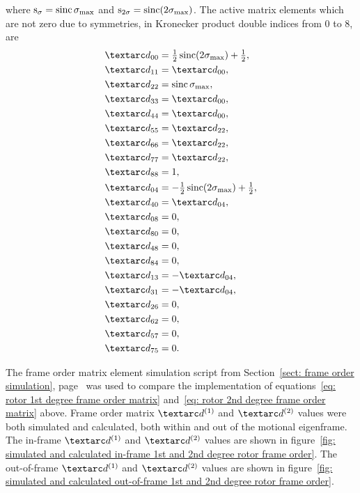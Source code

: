 where $\textrm{s}_\sigma = \operatorname{sinc}\sigma_\textrm{max}$ and $\textrm{s}_{2\sigma} = \operatorname{sinc}(2\sigma_\textrm{max})$.
The active matrix elements which are not zero due to symmetries, in Kronecker product double indices from 0 to 8, are
\begin{subequations} \label{eq: rotor 2nd degree frame order matrix}
\begin{align}
    &\FO_{00} = \half\sinc(2\conesmax) + \half , \\
    &\FO_{11} = \FO_{00} , \\
    &\FO_{22} = \sinc\conesmax , \\
    &\FO_{33} = \FO_{00} , \\
    &\FO_{44} = \FO_{00} , \\
    &\FO_{55} = \FO_{22} , \\
    &\FO_{66} = \FO_{22} , \\
    &\FO_{77} = \FO_{22} , \\
    &\FO_{88} = 1 , \\
    &\FO_{04} = -\half\sinc(2\conesmax) + \half , \\
    &\FO_{40} = \FO_{04} , \\
    &\FO_{08} = 0 , \\
    &\FO_{80} = 0 , \\
    &\FO_{48} = 0 , \\
    &\FO_{84} = 0 , \\
    &\FO_{13} = -\FO_{04} , \\
    &\FO_{31} = -\FO_{04} , \\
    &\FO_{26} = 0 , \\
    &\FO_{62} = 0 , \\
    &\FO_{57} = 0 , \\
    &\FO_{75} = 0 .
\end{align}
\end{subequations}



The frame order matrix element simulation script from Section~\ref{sect: frame order simulation}, page~\pageref{sect: frame order simulation} was used to compare the implementation of equations~\ref{eq: rotor 1st degree frame order matrix} and~\ref{eq: rotor 2nd degree frame order matrix} above.
Frame order matrix $\FOone$ and $\FOtwo$ values were both simulated and calculated, both within and out of the motional eigenframe.
The in-frame $\FOone$ and $\FOtwo$ values are shown in figure~\ref{fig: simulated and calculated in-frame 1st and 2nd degree rotor frame order}.
The out-of-frame $\FOone$ and $\FOtwo$ values are shown in figure~\ref{fig: simulated and calculated out-of-frame 1st and 2nd degree rotor frame order}.



